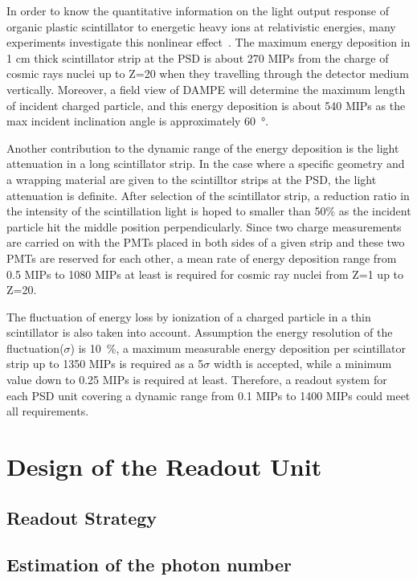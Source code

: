 \documentclass[5p, times]{elsarticle}
\begin{document}
In order to know the quantitative information on the light output response of organic plastic scintillator to energetic heavy ions at relativistic energies, many experiments investigate this nonlinear effect~\cite{dwyer1985plastic,bindi2005performance,marrocchesi2011beam}. 
The maximum energy deposition in 1 cm thick scintillator strip at the PSD is about 270 MIPs from the charge of cosmic rays nuclei up to Z=20 when they travelling through the detector medium vertically. 
Moreover, a field view of DAMPE will determine the maximum length of incident charged particle, and this energy deposition is about 540 MIPs as the max incident inclination angle is approximately \SI{60}{\degree}.

Another contribution to the dynamic range of the energy deposition is the light attenuation in a long scintillator strip. 
In the case where a specific geometry and a wrapping material are given to the scintilltor strips at the PSD, the light attenuation is definite. 
After selection of the scintillator strip, a reduction ratio in the intensity of the scintillation light is hoped to smaller than 50\% as the incident particle hit the middle position perpendicularly.
Since two charge measurements are carried on with the PMTs placed in both sides of a given strip and these two PMTs are reserved for each other, a mean rate of energy deposition range from 0.5 MIPs to 1080 MIPs at least is required for cosmic ray nuclei from Z=1 up to Z=20.

The fluctuation of energy loss by ionization of a charged particle in a thin scintillator is also taken into account.
Assumption the energy resolution of the fluctuation($\sigma$) is \SI{10}{\percent}, a maximum measurable energy deposition per scintillator strip up to 1350 MIPs is required as a 5$\sigma $ width is accepted, while a minimum value down to 0.25 MIPs is required at least. 
Therefore, a readout system for each PSD unit covering a dynamic range from 0.1 MIPs to 1400 MIPs could meet all requirements.

\section{Design of the Readout Unit}
\label{sec:design}

\subsection{Readout Strategy}

\subsection{Estimation of the photon number}
\end{document}
